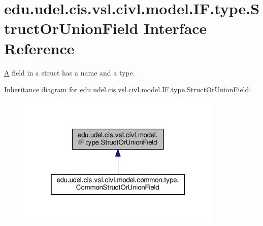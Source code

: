 \hypertarget{interfaceedu_1_1udel_1_1cis_1_1vsl_1_1civl_1_1model_1_1IF_1_1type_1_1StructOrUnionField}{}\section{edu.\+udel.\+cis.\+vsl.\+civl.\+model.\+I\+F.\+type.\+Struct\+Or\+Union\+Field Interface Reference}
\label{interfaceedu_1_1udel_1_1cis_1_1vsl_1_1civl_1_1model_1_1IF_1_1type_1_1StructOrUnionField}


\hyperlink{structA}{A} field in a struct has a name and a type.  




Inheritance diagram for edu.\+udel.\+cis.\+vsl.\+civl.\+model.\+I\+F.\+type.\+Struct\+Or\+Union\+Field\+:
\nopagebreak
\begin{figure}[H]
\begin{center}
\leavevmode
\includegraphics[width=277pt]{interfaceedu_1_1udel_1_1cis_1_1vsl_1_1civl_1_1model_1_1IF_1_1type_1_1StructOrUnionField__inherit__graph}
\end{center}
\end{figure}
